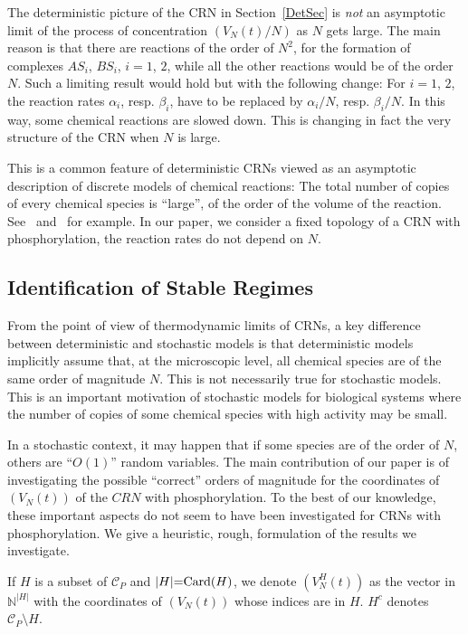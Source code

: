 \documentclass[english]{amsart}
\newcommand{\N}{\ensuremath{\mathbb{N}}}
\newcommand{\cal}[1]{\ensuremath{\mathcal{#1}}}
\def\card{{\rm Card}}
\numberwithin{proposition}{section}
\begin{document}
The deterministic picture of the CRN in Section~\ref{DetSec} is {\em not} an asymptotic limit of the process of concentration $(V_N(t)/N)$ as $N$ gets large.
The main reason is that there are reactions of the order of $N^2$, for the formation of complexes ${ AS}_i$, ${ BS}_i$, $i{=}1$, $2$, while all the other reactions would be of the order $N$. Such a limiting result would hold but with the following change: For $i{=}1$, $2$, the reaction rates $\alpha_i$, resp. $\beta_i$,  have to be replaced by $\alpha_i/N$, resp. $\beta_i/N$. In this way, some chemical reactions are slowed down.  This is changing in fact the very structure of the CRN when $N$ is large. 

This is a common feature of deterministic CRNs viewed as an asymptotic description of discrete models of chemical reactions: The total number of copies of every chemical species is ``large'', of the order of the volume of the reaction.  See~\citet{Mozgunov} and~\citet{LR23} for example. In our paper, we consider a fixed topology of a CRN with phosphorylation,  the reaction rates do not depend on $N$. 

\subsection{Identification of Stable Regimes}
From the point of view of thermodynamic limits of CRNs, a key difference between deterministic and stochastic models is that  deterministic models implicitly assume that, at the microscopic level,  all chemical species are of the same order of magnitude $N$. This is not necessarily true for stochastic models. This is an important motivation of stochastic models for biological systems where the number of copies of some  chemical species with high activity  may be small.

In a stochastic context,  it may happen that if some species are of the order of $N$, others are ``$O(1)$'' random variables. 
The main contribution of our paper is of investigating the possible ``correct'' orders of magnitude for the coordinates of $(V_N(t))$ of the $CRN$ with phosphorylation. To the best of our knowledge, these important aspects do not seem to have been investigated for CRNs with phosphorylation. We give a  heuristic, rough,  formulation of the results we investigate.

If $H$ is a subset of ${\cal C}_P$ and  $|H|{=}\card(H)$, we denote $(V^H_N(t))$ as the vector  in $\N^{|H|}$  with the coordinates of $(V_N(t))$ whose indices are in $H$. $H^c$ denotes ${\cal C}_P{\setminus}H$. 
\end{document}

